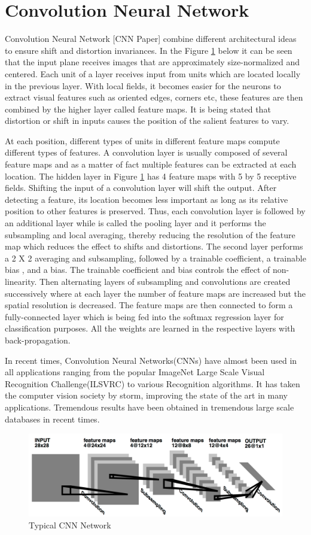 \section{Convolution Neural Network} \label{sec:build5}

Convolution Neural Network [CNN Paper] combine different architectural ideas to ensure  shift and distortion invariances. In the Figure \ref{fig:Figure19} below it  can be seen that the input plane receives images that are approximately size-normalized and centered. Each unit of a layer receives input from units which are located locally in the previous layer. With local fields, it becomes easier for the neurons to extract visual features such as oriented edges, corners etc, these features are then combined by the higher layer called feature maps. It is being stated that distortion or shift in inputs causes the position of the salient features to vary. 

At each position, different types of units in different feature maps compute different types of features. A convolution layer is usually composed of several feature maps and as a matter of fact multiple features can be extracted at each location. The hidden layer in Figure \ref{fig:Figure19} has 4 feature maps with 5 by 5 receptive fields. Shifting the input of a convolution layer will shift the output. After detecting a feature, its location becomes less important as long as its relative position to other features is preserved. Thus, each convolution layer is followed by an additional layer while is called the pooling layer and it performs the subsampling and local averaging, thereby reducing the resolution of the feature map which reduces the effect to shifts and distortions. The second layer performs a 2 X 2 averaging and subsampling, followed by a trainable coefficient, a trainable bias , and a bias. The trainable coefficient and bias controls the effect of non-linearity. Then alternating layers of subsampling and convolutions are created successively where at each layer the number of feature maps are increased but the spatial resolution is decreased. The feature maps are then connected to form a fully-connected layer which is being fed into the softmax regression layer for classification purposes. All the weights are learned in the respective layers with back-propagation.

In recent times, Convolution Neural Networks(CNNs) have almost been used in all applications ranging from the popular ImageNet Large Scale Visual Recognition Challenge(ILSVRC) to various Recognition algorithms. It has taken the computer vision society by storm, improving the state of the art in many applications. Tremendous results have been obtained in tremendous large scale databases in recent times.

\begin{figure}[t]
	\begin{center}
		\includegraphics[width=\textwidth]{Figures/Figure19}
	\end{center}
	\caption{Typical CNN Network}
	\label{fig:Figure19}
\end{figure}

